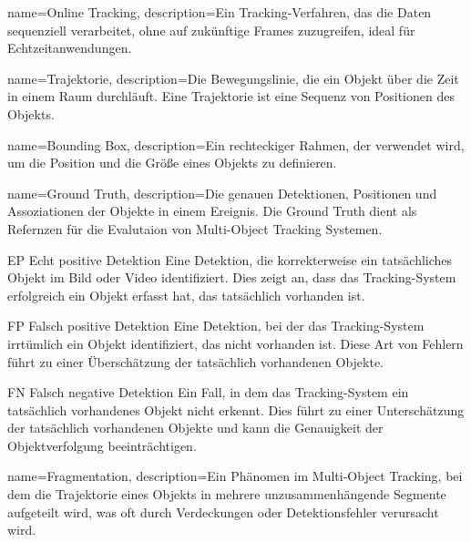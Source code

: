 {
name=Online Tracking,
description={Ein Tracking-Verfahren, das die Daten sequenziell verarbeitet, ohne auf zukünftige Frames zuzugreifen, ideal für Echtzeitanwendungen.}
}

{
name=Trajektorie,
description={Die Bewegungslinie, die ein Objekt über die Zeit in einem Raum durchläuft. Eine Trajektorie ist eine Sequenz von Positionen des Objekts.}
}

{
name=Bounding Box,
description={Ein rechteckiger Rahmen, der verwendet wird, um die Position und die Größe eines Objekts zu definieren.}
}

{
name=Ground Truth,
description={Die genauen Detektionen, Positionen und Assoziationen der Objekte in einem Ereignis. Die Ground Truth dient als Refernzen für die Evalutaion von Multi-Object Tracking Systemen.}
}




\newglossaryentrywithacronym
{EP}
{Echt positive Detektion}
{Eine Detektion, die korrekterweise ein tatsächliches Objekt im Bild oder Video identifiziert. Dies zeigt an, dass das Tracking-System erfolgreich ein Objekt erfasst hat, das tatsächlich vorhanden ist.}

\newglossaryentrywithacronym
{FP}
{Falsch positive Detektion}
{Eine Detektion, bei der das Tracking-System irrtümlich ein Objekt identifiziert, das nicht vorhanden ist. Diese Art von Fehlern führt zu einer Überschätzung der tatsächlich vorhandenen Objekte.}

\newglossaryentrywithacronym
{FN}
{Falsch negative Detektion}
{Ein Fall, in dem das Tracking-System ein tatsächlich vorhandenes Objekt nicht erkennt. Dies führt zu einer Unterschätzung der tatsächlich vorhandenen Objekte und kann die Genauigkeit der Objektverfolgung beeinträchtigen.}

{
name=Fragmentation,
description={Ein Phänomen im Multi-Object Tracking, bei dem die Trajektorie eines Objekts in mehrere unzusammenhängende Segmente aufgeteilt wird, was oft durch Verdeckungen oder Detektionsfehler verursacht wird.}
}

